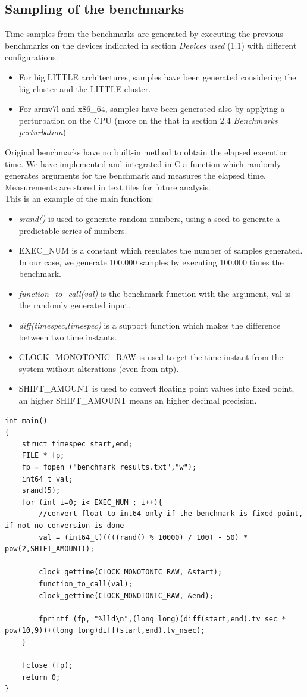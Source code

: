 \subsection{Sampling of the benchmarks}

Time samples from the benchmarks are generated by executing the previous benchmarks on the devices indicated in section \textit{Devices used} (1.1) with different configurations:
\begin{itemize}
	\item For big.LITTLE architectures, samples have been generated considering the big cluster and the LITTLE cluster.
	\item For armv7l and x86\_64, samples have been generated also by applying a perturbation on the CPU (more on the that in section 2.4 \textit{Benchmarks perturbation})
\end{itemize}
Original benchmarks have no built-in method to obtain the elapsed execution time. We have implemented and integrated in C a function which randomly generates arguments for the benchmark and measures the elapsed time.\\
Measurements are stored in text files for future analysis.\\[0.3cm]
This is an example of the main function:
\begin{itemize}
	\item \textit{srand()} is used to generate random numbers, using a seed to generate a predictable series of numbers.
	\item EXEC\_NUM is a constant which regulates the number of samples generated. In our case, we generate 100.000 samples by executing 100.000 times the benchmark.
	\item \textit{function\_to\_call(val)} is the benchmark function with the argument, val is the randomly generated input.
	\item \textit{diff(timespec,timespec)} is a support function which makes the difference between two time instants.
	\item CLOCK\_MONOTONIC\_RAW is used to get the time instant from the system without alterations (even from ntp).
	\item SHIFT\_AMOUNT is used to convert floating point values into fixed point, an higher SHIFT\_AMOUNT means an higher decimal precision.
\end{itemize}
\begin{lstlisting}
int main()
{
	struct timespec start,end;
	FILE * fp;
	fp = fopen ("benchmark_results.txt","w");
	int64_t val;
	srand(5);
	for (int i=0; i< EXEC_NUM ; i++){
		//convert float to int64 only if the benchmark is fixed point, if not no conversion is done
		val = (int64_t)((((rand() % 10000) / 100) - 50) * pow(2,SHIFT_AMOUNT));
		
		clock_gettime(CLOCK_MONOTONIC_RAW, &start);
		function_to_call(val);
		clock_gettime(CLOCK_MONOTONIC_RAW, &end);
		
		fprintf (fp, "%lld\n",(long long)(diff(start,end).tv_sec * pow(10,9))+(long long)diff(start,end).tv_nsec);
	}
	
	fclose (fp);
	return 0;
}
\end{lstlisting}

